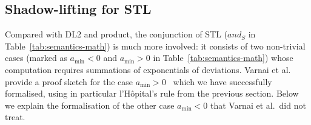 \documentclass[a4paper,UKenglish,cleveref, autoref, thm-restate]{lipics-v2021}
\def\DLtwo{\textrm{DL2}}
\def\STL{\textrm{STL}}
\def\product{\textrm{product}}
\begin{document}
\subsection{Shadow-lifting for \STL{}}
\label{sec:slstl}

Compared with \DLtwo{} and \product{}, the conjunction of \STL{}
($and_S$ in Table~\ref{tab:semantics-math}) is much more involved: it
consists of two non-trivial cases (marked as $a_{\min} < 0$ and $a_{\min} > 0$
in Table~\ref{tab:semantics-math}) whose computation requires
summations of exponentials of deviations.
%
Varnai et al.  provide a proof sketch for the case
$a_{\min} > 0$~\cite[Sect.~V]{varnai} which we have successfully
formalised, using in particular l'H\^opital's rule from the previous
section. Below we explain the formalisation of the other case
$a_{\min} < 0$ that Varnai et al.\ did not treat.
\end{document}
